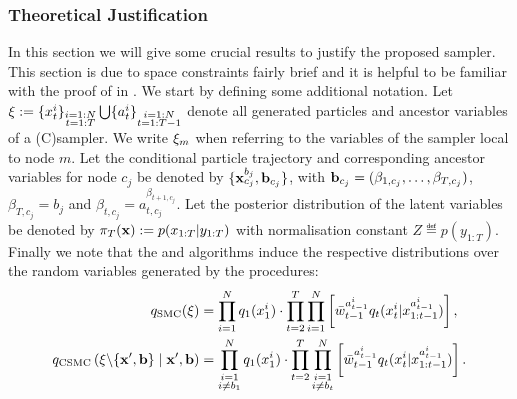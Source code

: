 \subsubsection{Theoretical Justification}
\label{sec:theory}
In this section we will give some crucial results to justify the proposed \ipmc sampler. This section is due to space constraints fairly brief and it is helpful to be familiar with the proof of \pg in \citet{andrieuDH2010}.
We start by defining some additional notation.
Let $\mathbf{\xi} := \{x_{t}^i\}_{\substack{i=1:N\\t=1:T}} \bigcup \{a_{t}^i\}_{\substack{i=1:N\\t=1:T-1}}$
denote all generated particles and ancestor variables of a (C)\smc sampler.
We write $\mathbf{\xi}_m$ when referring to the variables of the sampler local to node $m$.
%
Let the conditional particle trajectory and corresponding ancestor variables for node $c_j$ be denoted by $\{\mathbf{x}_{c_j}^{b_j},\mathbf{b}_{c_j}\}$, with $\mathbf{b}_{c_j} = (\beta_{1,c_j},\ldots,\beta_{T,c_j})$,
$\beta_{T,c_j} = b_j$ and $\beta_{t,c_j} = a_{t,c_j}^{\beta_{t+1,c_j}}$. %
Let the posterior distribution of the latent variables be denoted by $\pi_T(\mathbf{x}) := p(x_{1:T}|y_{1:T})$ with normalisation constant $Z \eqdef p(y_{1:T})$. 
%
Finally we %
note that the \smc and \csmc algorithms induce the respective distributions over the random variables
generated by the procedures:
\vspace{-2mm}
\begin{align*}
q_{\text{SMC}}(\mathbf{\xi}) &= \prod_{i=1}^N q_1(x_{1}^i) \cdot \prod_{t=2}^T \prod_{i=1}^N \left[ 
\bar w_{t-1}^{a_{t-1}^i}
q_t(x_{t}^i|x_{1:t-1}^{a_{t-1}^i}) \right], \\
q_{\text{CSMC}}\left(\mathbf{\xi} \backslash \{\mathbf{x}', \mathbf{b}\} \mid \mathbf{x}', \mathbf{b} \right) &= \prod_{\substack{i=1\\i\neq b_{1}}}^N  q_1(x_{1}^i) \cdot \prod_{t=2}^T \prod_{\substack{i=1\\i\neq b_{t}}}^N \left[
\bar w_{t-1}^{a_{t-1}^i}
q_t(x_{t}^i|x_{1:t-1}^{a_{t-1}^i})\right].
\end{align*}
